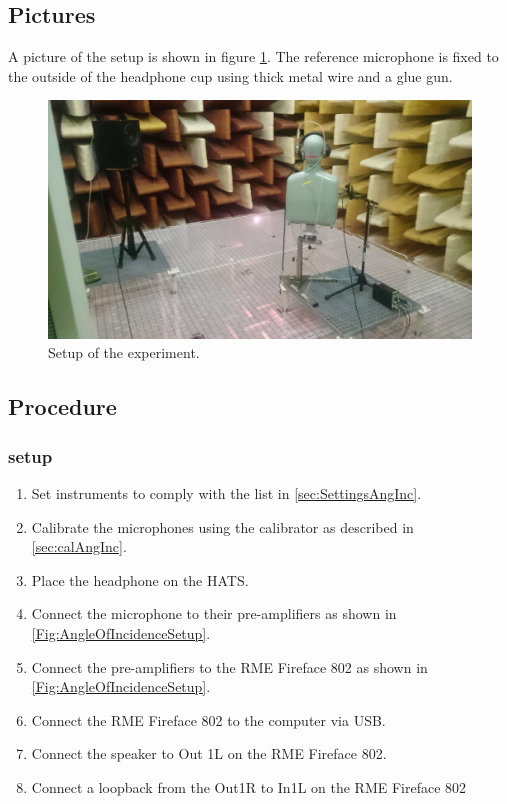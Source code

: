 \subsection{Pictures}
A picture of the setup is shown in figure \ref{AngIncidenceSetup}. The reference microphone is fixed to the outside of the headphone cup using thick metal wire and a glue gun.  
\begin{figure}[H]
	\includegraphics[width=\textwidth]{../Journal/Experiments/AngleOfIncidence/AngInSetup.jpg}
	\caption{Setup of the experiment.}
	\label{AngIncidenceSetup}	
\end{figure}


\subsection{Procedure}
\subsubsection{setup}
\begin{enumerate}
	\item Set instruments to comply with the list in \ref{sec:SettingsAngInc}.
	\item Calibrate the microphones using the calibrator as described in \autoref{sec:calAngInc}.
	\item Place the headphone on the HATS.
	\item Connect the microphone to their pre-amplifiers as shown in \autoref{Fig:AngleOfIncidenceSetup}. 
	\item Connect the pre-amplifiers to the RME Fireface 802 as shown in \autoref{Fig:AngleOfIncidenceSetup}. 
	\item Connect the RME Fireface 802 to the computer via USB.
	\item Connect the speaker to Out 1L on the RME Fireface 802.
	\item Connect a loopback from the Out1R to In1L on the RME Fireface 802
\end{enumerate}



